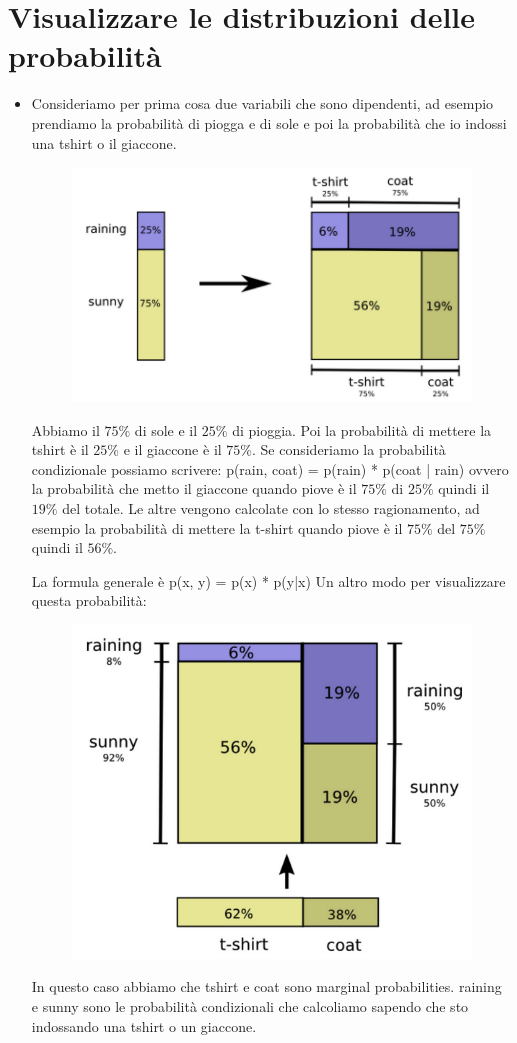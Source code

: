 \documentclass[14pt]{extreport}
\begin{document}
\section{Visualizzare le distribuzioni delle probabilità}

\begin{itemize}
	\item Consideriamo per prima cosa due variabili che sono dipendenti, ad esempio prendiamo la probabilità di piogga e di sole e poi la probabilità
	che io indossi una tshirt o il giaccone.

	      \begin{figure}[H]
		      \centering
		      \includegraphics[width=0.7\linewidth]{594.jpeg}
	      \end{figure}
	      Abbiamo il $75\%$ di sole e il $25\%$ di pioggia. Poi la probabilità di mettere la tshirt è il $25\%$ e il giaccone è il $75\%$. Se
	      consideriamo la probabilità condizionale possiamo scrivere: p(rain, coat) = p(rain) * p(coat | rain) ovvero la probabilità che metto il
	      giaccone quando piove è il $75\%$ di $25\%$ quindi il $19\%$ del totale. Le altre vengono calcolate con lo stesso ragionamento, ad esempio
	      la probabilità di mettere la t-shirt quando piove è il $75\%$ del $75\%$ quindi il $56\%$.

	      La formula generale è p(x, y) = p(x) * p(y|x) Un altro modo per visualizzare questa probabilità:

	      \begin{figure}[H]
		      \centering
		      \includegraphics[width=0.7\linewidth]{595.jpeg}
	      \end{figure}
	      In questo caso abbiamo che tshirt e coat sono marginal probabilities. raining e sunny sono le probabilità condizionali che calcoliamo
	      sapendo che sto indossando una tshirt o un giaccone.

\end{itemize}
\end{document}
